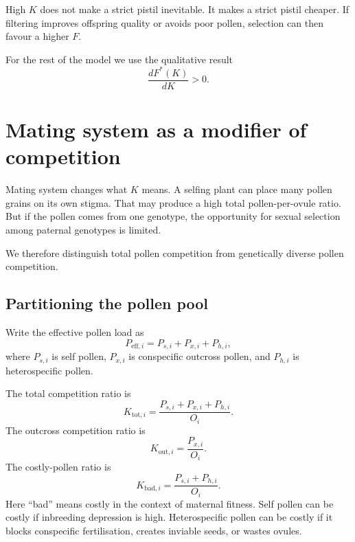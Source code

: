 \documentclass[12pt]{article}
\begin{document}
\begin{conclusionbox}
High $K$ does not make a strict pistil inevitable. It makes a strict pistil cheaper. If filtering improves offspring quality or avoids poor pollen, selection can then favour a higher $F$.
\end{conclusionbox}

For the rest of the model we use the qualitative result
\begin{equation}
\frac{dF^*(K)}{dK}>0.
\label{eq:dFdK}
\end{equation}

\section{Mating system as a modifier of competition}

Mating system changes what $K$ means. A selfing plant can place many pollen grains on its own stigma. That may produce a high total pollen-per-ovule ratio. But if the pollen comes from one genotype, the opportunity for sexual selection among paternal genotypes is limited.

We therefore distinguish total pollen competition from genetically diverse pollen competition.

\subsection{Partitioning the pollen pool}

Write the effective pollen load as
\begin{equation}
P_{\mathrm{eff},i}=P_{s,i}+P_{x,i}+P_{h,i},
\label{eq:pollenpartition}
\end{equation}
where $P_{s,i}$ is self pollen, $P_{x,i}$ is conspecific outcross pollen, and $P_{h,i}$ is heterospecific pollen.

The total competition ratio is
\begin{equation}
K_{\mathrm{tot},i}=\frac{P_{s,i}+P_{x,i}+P_{h,i}}{O_i}.
\label{eq:Ktot}
\end{equation}
The outcross competition ratio is
\begin{equation}
K_{\mathrm{out},i}=\frac{P_{x,i}}{O_i}.
\label{eq:Kout}
\end{equation}
The costly-pollen ratio is
\begin{equation}
K_{\mathrm{bad},i}=\frac{P_{s,i}+P_{h,i}}{O_i}.
\label{eq:Kbad}
\end{equation}
Here ``bad'' means costly in the context of maternal fitness. Self pollen can be costly if inbreeding depression is high. Heterospecific pollen can be costly if it blocks conspecific fertilisation, creates inviable seeds, or wastes ovules.
\end{document}
